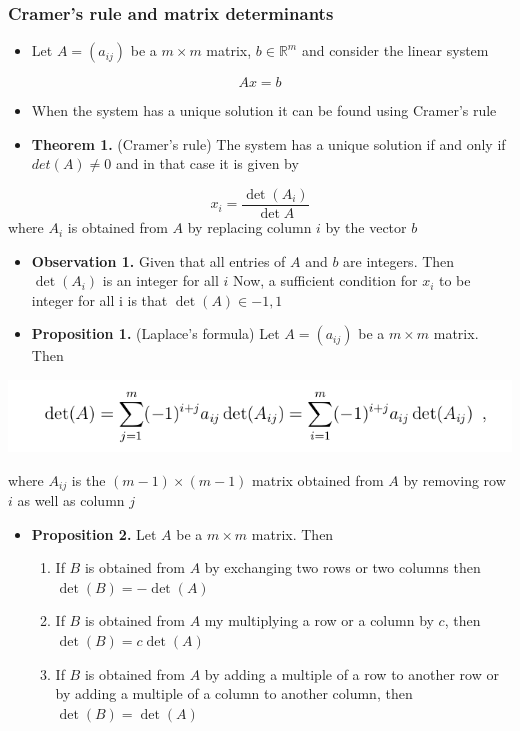 \documentclass[11pt]{article}
\begin{document}
\subsubsection{Cramer's rule and matrix determinants}
\label{sec:orgf8704ac}
\begin{itemize}
\item Let \(A= (a_{ij})\) be a \(m \times m\) matrix, \(b \in \mathbb R^m\) and consider the linear system
\end{itemize}
\begin{equation}
  Ax = b
\end{equation}
\begin{itemize}
\item When the system has a unique solution it can be found using Cramer's rule

\item \textbf{Theorem 1.} (Cramer's rule) The system has a unique solution if and only if \(det(A) \ne 0\) and in that case it is given by
\end{itemize}
\begin{equation}
  x_i = \frac{\det{(A_i)}}{\det{A}}
\end{equation}
where \(A_i\) is obtained from \(A\) by replacing column \(i\) by the vector \(b\) 

\begin{itemize}
\item \textbf{Observation 1.} Given that all entries of \(A\) and \(b\) are integers. Then \(\det(A_i)\) is an integer for all \(i\) Now, a sufficient condition for \(x_i\) to be integer for all i is that \(\det(A) \in {-1,1}\)

\item \textbf{Proposition 1.} (Laplace's formula) Let \(A = (a_{ij})\) be a \(m \times m\) matrix. Then
\end{itemize}
\begin{center}
\includegraphics[width=.9\linewidth]{Network Flows/screenshot_2019-02-24_14-37-12.png}
\end{center}
where \(A_{ij}\) is the \((m-1) \times (m-1)\) matrix obtained from \(A\) by removing row \(i\) as well as column \(j\)

\begin{itemize}
\item \textbf{Proposition 2.} Let \(A\) be a \(m \times m\) matrix. Then
\begin{enumerate}
\item If \(B\) is obtained from \(A\) by exchanging two rows or two columns then \(\det(B) = -\det(A)\)
\item If \(B\) is obtained from \(A\) my multiplying a row or a column by \(c\), then \(\det(B) = c \det(A)\)
\item If \(B\) is obtained from \(A\) by adding a multiple of a row to another row or by adding a multiple of a column to another column, then \(\det(B) = \det(A)\)
\end{enumerate}
\end{itemize}
\end{document}
